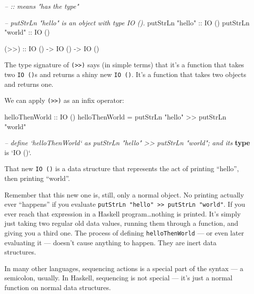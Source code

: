 \documentclass[]{article}
\newenvironment{Shaded}{}{}
\newcommand{\KeywordTok}[1]{\textcolor[rgb]{0.00,0.44,0.13}{\textbf{{#1}}}}
\newcommand{\DataTypeTok}[1]{\textcolor[rgb]{0.56,0.13,0.00}{{#1}}}
\newcommand{\StringTok}[1]{\textcolor[rgb]{0.25,0.44,0.63}{{#1}}}
\newcommand{\CommentTok}[1]{\textcolor[rgb]{0.38,0.63,0.69}{\textit{{#1}}}}
\newcommand{\OtherTok}[1]{\textcolor[rgb]{0.00,0.44,0.13}{{#1}}}
\newcommand{\FunctionTok}[1]{\textcolor[rgb]{0.02,0.16,0.49}{{#1}}}
\newcommand{\NormalTok}[1]{{#1}}
\begin{document}
\begin{Shaded}
\begin{Highlighting}[]
\CommentTok{-- :: means "has the type"}

\CommentTok{-- putStrLn "hello" is an object with type IO ().}
\NormalTok{putStrLn }\StringTok{"hello"}\OtherTok{ ::} \DataTypeTok{IO} \NormalTok{()}
\NormalTok{putStrLn }\StringTok{"world"}\OtherTok{ ::} \DataTypeTok{IO} \NormalTok{()}

\OtherTok{(>>) ::} \DataTypeTok{IO} \NormalTok{() }\OtherTok{->} \DataTypeTok{IO} \NormalTok{() }\OtherTok{->} \DataTypeTok{IO} \NormalTok{()}
\end{Highlighting}
\end{Shaded}

The type signature of \texttt{(\textgreater{}\textgreater{})} says (in simple
terms) that it's a function that takes two \texttt{IO\ ()}s and returns a shiny
new \texttt{IO\ ()}. It's a function that takes two objects and returns one.

We can apply \texttt{(\textgreater{}\textgreater{})} as an infix operator:

\begin{Shaded}
\begin{Highlighting}[]
\OtherTok{helloThenWorld ::} \DataTypeTok{IO} \NormalTok{()}
\NormalTok{helloThenWorld }\FunctionTok{=} \NormalTok{putStrLn }\StringTok{"hello"} \FunctionTok{>>} \NormalTok{putStrLn }\StringTok{"world"}

\CommentTok{-- define `helloThenWorld` as putStrLn "hello" >> putStrLn "world"; and its}
\KeywordTok{type} \NormalTok{is }\OtherTok{`IO ()`}\FunctionTok{.}
\end{Highlighting}
\end{Shaded}

That new \texttt{IO\ ()} is a data structure that represents the act of printing
``hello'', then printing ``world''.

Remember that this new one is, still, only a normal object. No printing actually
ever ``happens'' if you evaluate
\texttt{putStrLn\ "hello"\ \textgreater{}\textgreater{}\ putStrLn\ "world"}. If
you ever reach that expression in a Haskell program\ldots{}nothing is printed.
It's simply just taking two regular old data values, running them through a
function, and giving you a third one. The process of defining
\texttt{helloThenWorld} --- or even later evaluating it --- doesn't cause
anything to happen. They are inert data structures.

In many other languages, sequencing actions is a special part of the syntax ---
a semicolon, usually. In Haskell, sequencing is not special --- it's just a
normal function on normal data structures.
\end{document}
